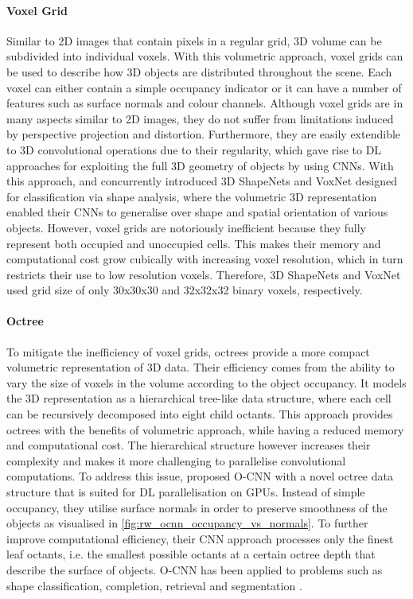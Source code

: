 \paragraph{Voxel Grid} Similar to 2D images that contain pixels in a regular grid, 3D volume can be subdivided into individual voxels. With this volumetric approach, voxel grids can be used to describe how 3D objects are distributed throughout the scene. Each voxel can either contain a simple occupancy indicator or it can have a number of features such as surface normals and colour channels. Although voxel grids are in many aspects similar to 2D images, they do not suffer from limitations induced by perspective projection and distortion. Furthermore, they are easily extendible to 3D convolutional operations due to their regularity, which gave rise to DL approaches for exploiting the full 3D geometry of objects by using CNNs. With this approach, \citet{wu_3d_2015} and \citet{maturana_voxnet_2015} concurrently introduced 3D ShapeNets and VoxNet designed for classification via shape analysis, where the volumetric 3D representation enabled their CNNs to generalise over shape and spatial orientation of various objects. However, voxel grids are notoriously inefficient because they fully represent both occupied and unoccupied cells. This makes their memory and computational cost grow cubically with increasing voxel resolution, which in turn restricts their use to low resolution voxels. Therefore, 3D ShapeNets and VoxNet used grid size of only 30x30x30 and 32x32x32 binary voxels, respectively.


\paragraph{Octree} To mitigate the inefficiency of voxel grids, octrees provide a more compact volumetric representation of 3D data. Their efficiency comes from the ability to vary the size of voxels in the volume according to the object occupancy. It models the 3D representation as a hierarchical tree-like data structure, where each cell can be recursively decomposed into eight child octants. This approach provides octrees with the benefits of volumetric approach, while having a reduced memory and computational cost. The hierarchical structure however increases their complexity and makes it more challenging to parallelise convolutional computations. To address this issue, \citet{wang_o-cnn_2017} proposed O-CNN with a novel octree data structure that is suited for DL parallelisation on GPUs. Instead of simple occupancy, they utilise surface normals in order to preserve smoothness of the objects as visualised in \autoref{fig:rw_ocnn_occupancy_vs_normals}. To further improve computational efficiency, their CNN approach processes only the finest leaf octants, i.e. the smallest possible octants at a certain octree depth that describe the surface of objects. O-CNN has been applied to problems such as shape classification, completion, retrieval and segmentation \cite{wang_o-cnn_2017, wang_deep_2020}.

